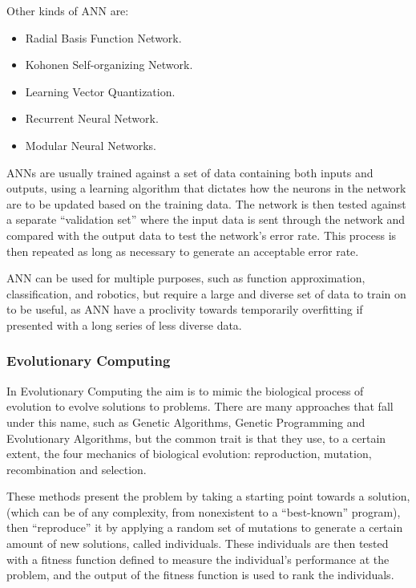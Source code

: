 Other kinds of ANN are:
\begin{itemize}
\item Radial Basis Function Network.
\item Kohonen Self-organizing Network.
\item Learning Vector Quantization.
\item Recurrent Neural Network.
\item Modular Neural Networks.
\end{itemize}

ANNs are usually trained against a set of data containing both inputs and
outputs, using a learning algorithm that dictates how the neurons in the network
are to be updated based on the training data. The network is then tested against
a separate ``validation set'' where the input data is sent through the network
and compared with the output data to test the network's error rate. This process
is then repeated as long as necessary to generate an acceptable error rate.

ANN can be used for multiple purposes, such as function approximation,
classification, and robotics, but require a large and diverse set of data to
train on to be useful, as ANN have a proclivity towards temporarily overfitting
if presented with a long series of less diverse data.

\subsubsection{Evolutionary Computing}
\label{sec:evol-comp}

In Evolutionary Computing the aim is to mimic the biological process of
evolution to evolve solutions to problems. There are many approaches that fall
under this name, such as Genetic Algorithms, Genetic Programming and
Evolutionary Algorithms, but the common trait is that they use, to a certain
extent, the four mechanics of biological evolution: reproduction, mutation,
recombination and selection.

These methods present the problem by taking a starting point towards a solution,
(which can be of any complexity, from nonexistent to a ``best-known'' program),
then ``reproduce'' it by applying a random set of mutations to generate a
certain amount of new solutions, called individuals. These individuals are then
tested with a fitness function defined to measure the individual's performance
at the problem, and the output of the fitness function is used to rank the
individuals.

